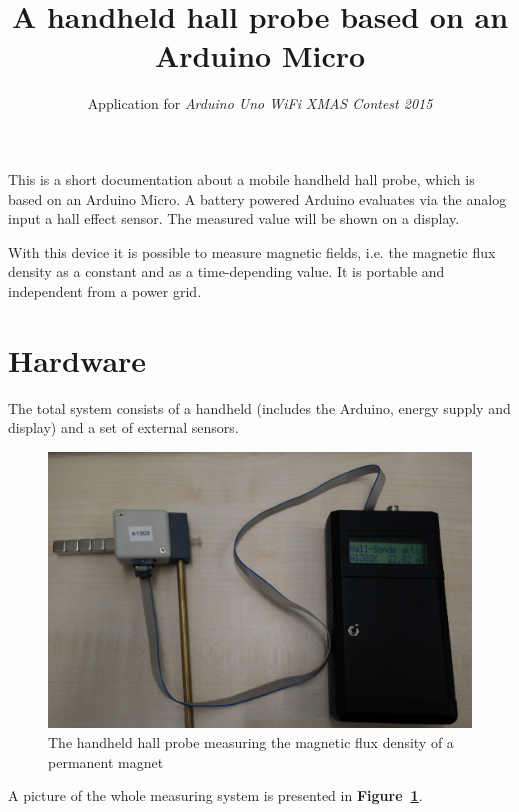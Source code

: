 \documentclass[twoside,accentcolor=tud2a,nochapname,11pt]{tudexercise}
\title{A handheld hall probe based on an Arduino Micro}
\subtitle{Application for \textit{Arduino Uno WiFi XMAS Contest 2015}}
\begin{document}
\maketitle

This is a short documentation about a mobile handheld hall probe, which is based on an Arduino Micro.
A battery powered Arduino evaluates via the analog input a hall effect sensor. The measured value will be shown on a display.

With this device it is possible to measure magnetic fields, i.e. the magnetic flux density as a constant and as a time-depending value. It is portable and independent from a power grid.

\section{Hardware}

The total system consists of a handheld (includes the Arduino, energy supply and display) and a set of external sensors.
\begin{figure}[ht]%
\centering
\includegraphics[width=.75\columnwidth]{../pictures/working_with_PM}%
\caption{The handheld hall probe measuring the magnetic flux density of a permanent magnet}%
\label{pic:working_with_PM}%
\end{figure}
A picture of the whole measuring system is presented in \textbf{Figure~\ref{pic:working_with_PM}}.
\end{document}
